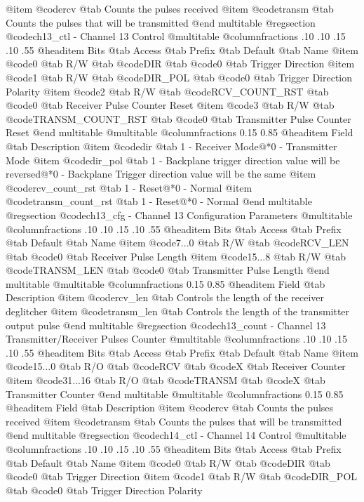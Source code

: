 @item @code{rcv} @tab Counts the pulses received
@item @code{transm} @tab Counts the pulses that will be transmitted
@end multitable
@regsection @code{ch13_ctl} - Channel 13 Control
@multitable @columnfractions .10 .10 .15 .10 .55
@headitem Bits @tab Access @tab Prefix @tab Default @tab Name
@item @code{0}
@tab R/W @tab
@code{DIR}
@tab @code{0} @tab 
Trigger Direction
@item @code{1}
@tab R/W @tab
@code{DIR_POL}
@tab @code{0} @tab 
Trigger Direction Polarity
@item @code{2}
@tab R/W @tab
@code{RCV_COUNT_RST}
@tab @code{0} @tab 
Receiver Pulse Counter Reset
@item @code{3}
@tab R/W @tab
@code{TRANSM_COUNT_RST}
@tab @code{0} @tab 
Transmitter Pulse Counter Reset
@end multitable
@multitable @columnfractions 0.15 0.85
@headitem Field @tab Description
@item @code{dir} @tab 1 - Receiver Mode@*0 - Transmitter Mode
@item @code{dir_pol} @tab 1 - Backplane trigger direction value will be reversed@*0 - Backplane Trigger direction value will be the same
@item @code{rcv_count_rst} @tab 1 - Reset@*0 - Normal
@item @code{transm_count_rst} @tab 1 - Reset@*0 - Normal
@end multitable
@regsection @code{ch13_cfg} - Channel 13 Configuration Parameters
@multitable @columnfractions .10 .10 .15 .10 .55
@headitem Bits @tab Access @tab Prefix @tab Default @tab Name
@item @code{7...0}
@tab R/W @tab
@code{RCV_LEN}
@tab @code{0} @tab 
Receiver Pulse Length
@item @code{15...8}
@tab R/W @tab
@code{TRANSM_LEN}
@tab @code{0} @tab 
Transmitter Pulse Length
@end multitable
@multitable @columnfractions 0.15 0.85
@headitem Field @tab Description
@item @code{rcv_len} @tab Controls the length of the receiver deglitcher
@item @code{transm_len} @tab Controls the length of the transmitter output pulse
@end multitable
@regsection @code{ch13_count} - Channel 13 Transmitter/Receiver Pulses Counter
@multitable @columnfractions .10 .10 .15 .10 .55
@headitem Bits @tab Access @tab Prefix @tab Default @tab Name
@item @code{15...0}
@tab R/O @tab
@code{RCV}
@tab @code{X} @tab 
Receiver Counter
@item @code{31...16}
@tab R/O @tab
@code{TRANSM}
@tab @code{X} @tab 
Transmitter Counter
@end multitable
@multitable @columnfractions 0.15 0.85
@headitem Field @tab Description
@item @code{rcv} @tab Counts the pulses received
@item @code{transm} @tab Counts the pulses that will be transmitted
@end multitable
@regsection @code{ch14_ctl} - Channel 14 Control
@multitable @columnfractions .10 .10 .15 .10 .55
@headitem Bits @tab Access @tab Prefix @tab Default @tab Name
@item @code{0}
@tab R/W @tab
@code{DIR}
@tab @code{0} @tab 
Trigger Direction
@item @code{1}
@tab R/W @tab
@code{DIR_POL}
@tab @code{0} @tab 
Trigger Direction Polarity
